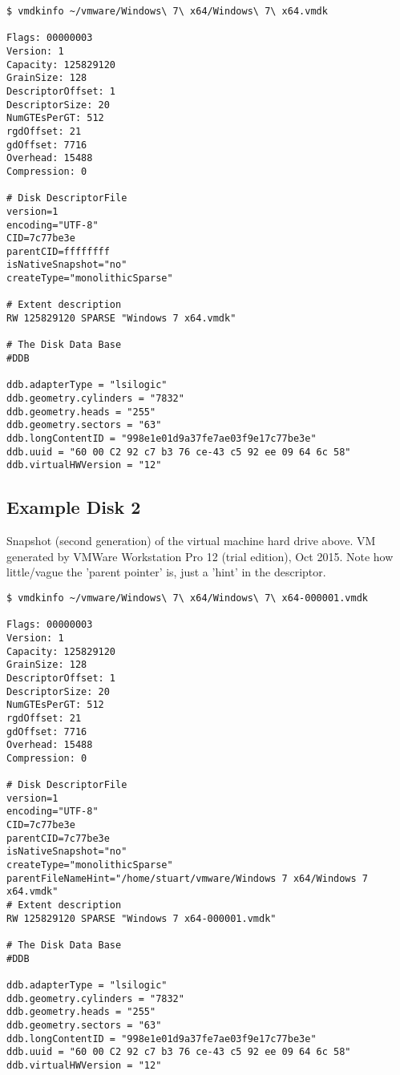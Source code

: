 \documentclass{article}
\begin{document}
\begin{verbatim}
$ vmdkinfo ~/vmware/Windows\ 7\ x64/Windows\ 7\ x64.vmdk 

Flags: 00000003
Version: 1
Capacity: 125829120
GrainSize: 128
DescriptorOffset: 1
DescriptorSize: 20
NumGTEsPerGT: 512
rgdOffset: 21
gdOffset: 7716
Overhead: 15488
Compression: 0

# Disk DescriptorFile
version=1
encoding="UTF-8"
CID=7c77be3e
parentCID=ffffffff
isNativeSnapshot="no"
createType="monolithicSparse"

# Extent description
RW 125829120 SPARSE "Windows 7 x64.vmdk"

# The Disk Data Base 
#DDB

ddb.adapterType = "lsilogic"
ddb.geometry.cylinders = "7832"
ddb.geometry.heads = "255"
ddb.geometry.sectors = "63"
ddb.longContentID = "998e1e01d9a37fe7ae03f9e17c77be3e"
ddb.uuid = "60 00 C2 92 c7 b3 76 ce-43 c5 92 ee 09 64 6c 58"
ddb.virtualHWVersion = "12"
\end{verbatim}

\subsection{Example Disk 2}

Snapshot (second generation) of the virtual machine hard drive
above. VM generated by VMWare Workstation Pro 12 (trial edition), Oct
2015.  Note how little/vague the 'parent pointer' is, just a 'hint' in
the descriptor.
  
\begin{verbatim}
$ vmdkinfo ~/vmware/Windows\ 7\ x64/Windows\ 7\ x64-000001.vmdk 

Flags: 00000003
Version: 1
Capacity: 125829120
GrainSize: 128
DescriptorOffset: 1
DescriptorSize: 20
NumGTEsPerGT: 512
rgdOffset: 21
gdOffset: 7716
Overhead: 15488
Compression: 0

# Disk DescriptorFile
version=1
encoding="UTF-8"
CID=7c77be3e
parentCID=7c77be3e
isNativeSnapshot="no"
createType="monolithicSparse"
parentFileNameHint="/home/stuart/vmware/Windows 7 x64/Windows 7 x64.vmdk"
# Extent description
RW 125829120 SPARSE "Windows 7 x64-000001.vmdk"

# The Disk Data Base 
#DDB

ddb.adapterType = "lsilogic"
ddb.geometry.cylinders = "7832"
ddb.geometry.heads = "255"
ddb.geometry.sectors = "63"
ddb.longContentID = "998e1e01d9a37fe7ae03f9e17c77be3e"
ddb.uuid = "60 00 C2 92 c7 b3 76 ce-43 c5 92 ee 09 64 6c 58"
ddb.virtualHWVersion = "12"
\end{verbatim}
\end{document}
